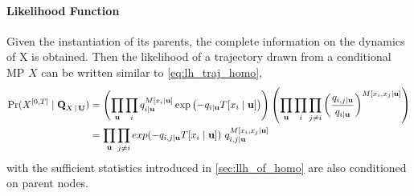 \paragraph*{Likelihood Function}
Given the instantiation of its parents, the complete information on the dynamics of X is obtained. Then the likelihood of a trajectory drawn from a conditional MP $ X $ can be written similar to \autoref{eq:lh_traj_homo},
\begin{align}
\operatorname{Pr}(X^{[0,T]}  \mid \textbf{Q}_{X\,|\, \textbf{U}}) &=  \left(\prod_{ \textbf{u}}\prod_{ i} q_{i\mid \textbf{u}}^{M[x_{i}\mid \textbf{u}]} \exp \left(-q_{i\mid \textbf{u}} T[x_{i}\mid \textbf{u}]\right)\right)\left(\prod_{ \textbf{u}}\prod_{ i} \prod_{ j \neq i} \left(\frac{q_{i,j\mid \textbf{u}}}{q_{i\mid \textbf{u}}}\right)^{M\left[x_{i}, x_{j}\mid \textbf{u}\right]}\right) \nonumber\\ & = \prod_{ \textbf{u}}\prod_{j\neq i}  exp(-q_{i,j\mid \textbf{u}}T[x_{i}\mid \textbf{u}]) \ q_{i,j\mid \textbf{u}}^{M[x_{i},x_{j}\mid \textbf{u}]}
\label{eq:lh_traj_cond}
\end{align}
with the sufficient statistics introduced in \autoref{sec:llh_of_homo} are also conditioned on parent nodes.



